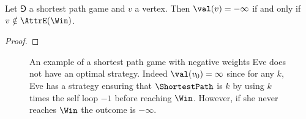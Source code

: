 
\begin{lemma}
\label{4-lem:detecting_minus_infinity}
Let $\Game$ a shortest path game and $v$ a vertex.
Then $\val(v) = -\infty$ if and only if $v \notin \AttrE(\Win)$.
\end{lemma}
\begin{proof}
\end{proof}

\begin{figure}
\centering
\caption{An example of a shortest path game with negative weights Eve does not have an optimal strategy.
Indeed $\val(v_0) = \infty$ since for any $k$, Eve has a strategy ensuring that $\ShortestPath$ is $k$
by using $k$ times the self loop $-1$ before reaching $\Win$.
However, if she never reaches $\Win$ the outcome is $-\infty$.}
\label{1-fig:optimal_strategies_shortest_path_game}
\end{figure}


